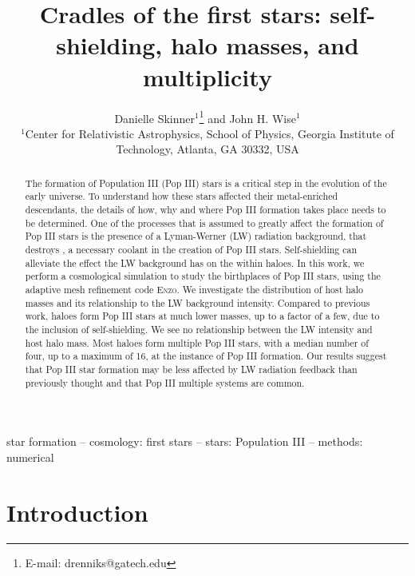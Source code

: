 \documentclass[fleqn,usenatbib]{mnras}
\title[Cradles of the first stars]{Cradles of the first stars: self-shielding, halo masses, and multiplicity}
\author[D. Skinner and J.~H. Wise]{
Danielle Skinner$^{1}$\thanks{E-mail: drenniks@gatech.edu}
and John H. Wise$^{1}$
\\
$^{1}$Center for Relativistic Astrophysics, School of Physics, Georgia Institute of Technology, Atlanta, GA 30332, USA\\
}
\begin{document}
\label{firstpage}
\pagerange{\pageref{firstpage}--\pageref{lastpage}}
\maketitle

\begin{abstract}
The formation of Population III (Pop III) stars is a critical step in the evolution of the early universe. To understand how these stars affected their metal-enriched descendants, the details of how, why and where Pop III formation takes place needs to be determined. One of the processes that is assumed to greatly affect the formation of Pop III stars is the presence of a Lyman-Werner (LW) radiation background, that destroys \hh{}, a necessary coolant in the creation of Pop III stars. Self-shielding can alleviate the effect the LW background has on the \hh{} within haloes. In this work, we perform a cosmological simulation to study the birthplaces of Pop III stars, using the adaptive mesh refinement code \textsc{Enzo}. We investigate the distribution of host halo masses and its relationship to the LW background intensity. Compared to previous work, haloes form Pop III stars at much lower masses, up to a factor of a few, due to the inclusion of \hh{} self-shielding. We see no relationship between the LW intensity and host halo mass. Most haloes form multiple Pop III stars, with a median number of four, up to a maximum of 16, at the instance of Pop III formation. Our results suggest that Pop III star formation may be less affected by LW radiation feedback than previously thought and that Pop III multiple systems are common. 
\end{abstract}{}

\begin{keywords}
star formation  -- cosmology: first stars -- stars: Population III -- methods: numerical
\end{keywords}


\section{Introduction}
\end{document}
